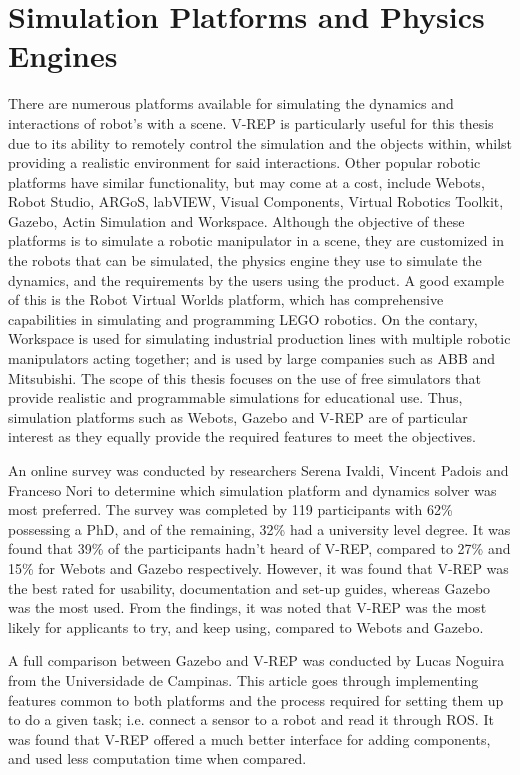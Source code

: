 \documentclass[12pt,openany,a4paper]{book}
\begin{document}
\section{Simulation Platforms and Physics Engines}
There are numerous platforms available for simulating the dynamics and interactions of robot's with a scene. V-REP is particularly useful for this thesis due to its ability to remotely control the simulation and the objects within, whilst providing a realistic environment for said interactions. Other popular robotic platforms have similar functionality, but may come at a cost, include Webots, Robot Studio, ARGoS, labVIEW, Visual Components, Virtual Robotics Toolkit, Gazebo, Actin Simulation and Workspace. Although the objective of these platforms is to simulate a robotic manipulator in a scene, they are customized in the robots that can be simulated, the physics engine they use to simulate the dynamics, and the requirements by the users using the product. A good example of this is the Robot Virtual Worlds platform, which has comprehensive capabilities in simulating and programming LEGO robotics. On the contary, Workspace is used for simulating industrial production lines with multiple robotic manipulators acting together; and is used by large companies such as ABB and Mitsubishi. The scope of this thesis focuses on the use of free simulators that provide realistic and programmable simulations for educational use. Thus, simulation platforms such as Webots, Gazebo and V-REP are of particular interest as they equally provide the required features to meet the objectives. 

An online survey was conducted by researchers Serena Ivaldi, Vincent Padois and Franceso Nori to determine which simulation platform and dynamics solver was most preferred. The survey was completed by 119 participants with 62\% possessing a PhD, and of the remaining, 32\% had a university level degree. It was found that 39\% of the participants hadn't heard of V-REP, compared to 27\% and 15\% for Webots and Gazebo respectively. However, it was found that V-REP was the best rated for usability, documentation and set-up guides, whereas Gazebo was the most used. From the findings, it was noted that V-REP was the most likely for applicants to try, and keep using, compared to Webots and Gazebo.

A full comparison between Gazebo and V-REP was conducted by Lucas Noguira from the Universidade de Campinas. This article goes through implementing features common to both platforms and the process required for setting them up to do a given task; i.e. connect a sensor to a robot and read it through ROS. It was found that V-REP offered a much better interface for adding components, and used less computation time when compared. 
\end{document}
